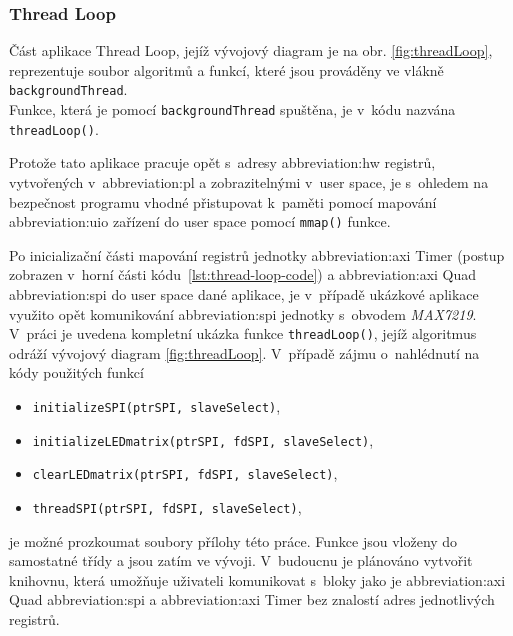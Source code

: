 \documentclass[a4paper, twoside, 11pt]{article}
\newcommand{\fbar}{\FloatBarrier}
\begin{document}
 	\fbar
 	\subsubsection{Thread Loop}\label{subsubsec:thread-loop}
 		Část aplikace Thread Loop, jejíž vývojový diagram je na obr. \ref{fig:threadLoop}, reprezentuje soubor algoritmů a funkcí, které jsou prováděny ve vlákně \texttt{backgroundThread}.\\Funkce, která je pomocí \texttt{backgroundThread} spuštěna, je v~kódu nazvána \texttt{threadLoop()}.\par
		Protože tato aplikace pracuje opět s~adresy \gls{abbreviation:hw} registrů, vytvořených v~\gls{abbreviation:pl} a zobrazitelnými v~user space, je s~ohledem na bezpečnost programu vhodné přistupovat k~paměti pomocí mapování \gls{abbreviation:uio} zařízení do user space pomocí \texttt{mmap()} funkce.\par
		Po inicializační části mapování registrů jednotky \gls{abbreviation:axi} Timer (postup zobrazen v~horní části kódu~\ref{lst:thread-loop-code}) a \gls{abbreviation:axi} Quad \gls{abbreviation:spi} do user space dané aplikace, je v~případě ukázkové aplikace využito opět komunikování \gls{abbreviation:spi} jednotky s~obvodem \textit{MAX7219}. V~práci je uvedena kompletní ukázka funkce \texttt{threadLoop()}, jejíž algoritmus odráží vývojový diagram \ref{fig:threadLoop}. V~případě zájmu o~nahlédnutí na kódy použitých funkcí
 		\begin{itemize}
			\item \texttt{initializeSPI(ptrSPI, slaveSelect)},
			\item \texttt{initializeLEDmatrix(ptrSPI, fdSPI, slaveSelect)},
			\item \texttt{clearLEDmatrix(ptrSPI, fdSPI, slaveSelect)},
			\item \texttt{threadSPI(ptrSPI, fdSPI, slaveSelect)},
		\end{itemize}
		   je možné prozkoumat soubory přílohy této práce. Funkce jsou vloženy do samostatné třídy a jsou zatím ve vývoji. V~budoucnu je plánováno vytvořit knihovnu, která umožňuje uživateli komunikovat s~bloky jako je \gls{abbreviation:axi} Quad \gls{abbreviation:spi} a \gls{abbreviation:axi} Timer bez znalostí adres jednotlivých registrů.
\end{document}
